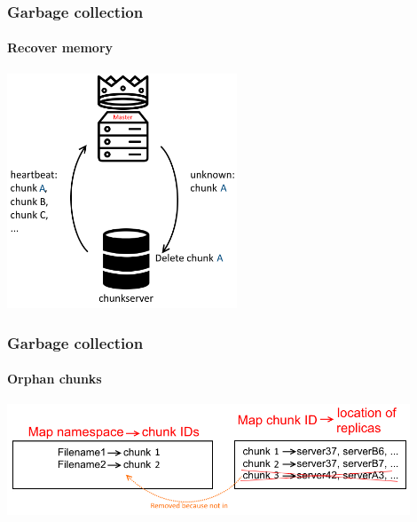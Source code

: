 \documentclass{beamer}
\newcommand{\slideheight}{7cm}
\newcommand{\slidewidth}{12cm}
\begin{document}
\begin{frame}
 \frametitle{Garbage collection}
 \framesubtitle{Recover memory}
 \centering
 \includegraphics[height=\slideheight]{figures/recoverymemoryschema.png}
\end{frame}

\begin{frame}
 \frametitle{Garbage collection}
 \framesubtitle{Orphan chunks}
 \centering
 \includegraphics[width=\slidewidth]{figures/orphanschema.png}
\end{frame}
\end{document}
